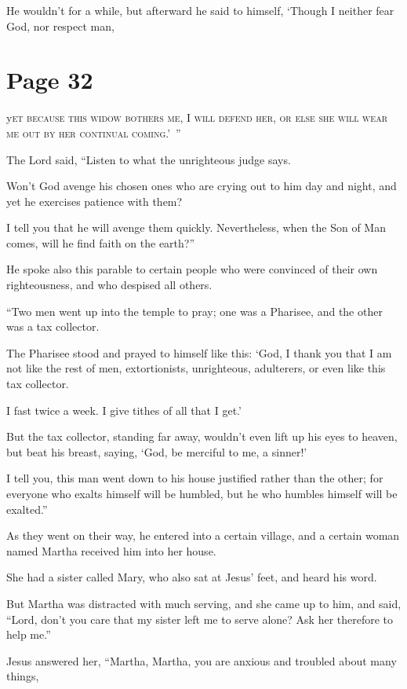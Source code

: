 He wouldn’t for a while, but afterward he said to himself, ‘Though I neither fear God, nor respect man,



\chapterornament
\section*{Page 32}

\lettrine{y}{et because this widow bothers me, I will defend her, or else she will wear me out by her continual coming.’ ”}

The Lord said, “Listen to what the unrighteous judge says.

Won’t God avenge his chosen ones who are crying out to him day and night, and yet he exercises patience with them?

I tell you that he will avenge them quickly. Nevertheless, when the Son of Man comes, will he find faith on the earth?”

He spoke also this parable to certain people who were convinced of their own righteousness, and who despised all others.

“Two men went up into the temple to pray; one was a Pharisee, and the other was a tax collector.

The Pharisee stood and prayed to himself like this: ‘God, I thank you that I am not like the rest of men, extortionists, unrighteous, adulterers, or even like this tax collector.

I fast twice a week. I give tithes of all that I get.’

But the tax collector, standing far away, wouldn’t even lift up his eyes to heaven, but beat his breast, saying, ‘God, be merciful to me, a sinner!’

I tell you, this man went down to his house justified rather than the other; for everyone who exalts himself will be humbled, but he who humbles himself will be exalted.”

As they went on their way, he entered into a certain village, and a certain woman named Martha received him into her house.

She had a sister called Mary, who also sat at Jesus’ feet, and heard his word.

But Martha was distracted with much serving, and she came up to him, and said, “Lord, don’t you care that my sister left me to serve alone? Ask her therefore to help me.”

Jesus answered her, “Martha, Martha, you are anxious and troubled about many things,

